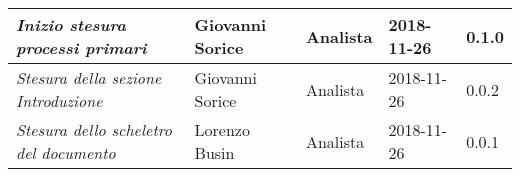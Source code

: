\begin{table}[H]
\begin{tabular}{p{4cm}|C{3cm}|C{3cm}|R{2.5cm}|R{2cm}}
		\emph{Inizio stesura processi primari} & Giovanni Sorice & Analista & 2018-11-26 & 0.1.0 \\
		\hline
		
		\emph{Stesura della sezione Introduzione} & Giovanni Sorice & Analista & 2018-11-26 & 0.0.2 \\
		\hline
		
		\emph{Stesura dello scheletro del documento} & Lorenzo Busin & Analista & 2018-11-26 & 0.0.1 \\
		
	\end{tabular}
	
\end{table}


\clearpage